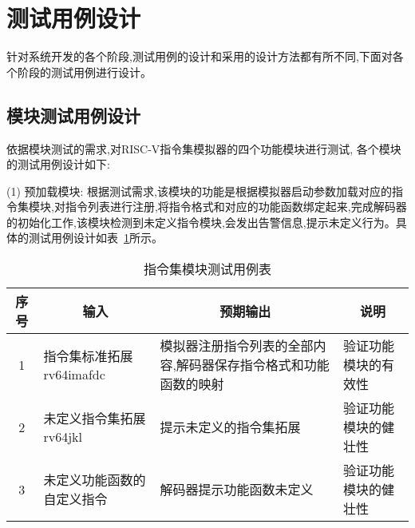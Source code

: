 \section{测试用例设计}
针对系统开发的各个阶段,测试用例的设计和采用的设计方法都有所不同,下面对各个阶段的测试用例进行设计。

\subsection{模块测试用例设计}
依据模块测试的需求,对RISC-V指令集模拟器的四个功能模块进行测试, 各个模块的测试用例设计如下:


(1) 预加载模块: 根据测试需求,该模块的功能是根据模拟器启动参数加载对应的指令集模块,对指令列表进行注册,将指令格式和对应的功能函数绑定起来,完成解码器的初始化工作,该模块检测到未定义指令模块,会发出告警信息,提示未定义行为。具体的测试用例设计如表~\ref{tab:test1}所示。
\begin{table}[h]
    \centering
    \caption{指令集模块测试用例表}
    \label{tab:test1}
    \begin{tabular}{clll}
      \toprule
      \multicolumn{1}{c}{序号} & \multicolumn{1}{c}{输入} & \multicolumn{1}{c}{预期输出} &\multicolumn{1}{c}{说明}\\
      \midrule
  1	& \multicolumn{1}{m{3.5cm}}{指令集标准拓展rv64imafdc} & \multicolumn{1}{m{3.5cm}}{模拟器注册指令列表的全部内容,解码器保存指令格式和功能函数的映射} & \multicolumn{1}{m{3.5cm}}{验证功能模块的有效性}\\
  \hline
  2	& \multicolumn{1}{m{3.5cm}}{未定义指令集拓展rv64jkl} & \multicolumn{1}{m{3.5cm}}{提示未定义的指令集拓展} & \multicolumn{1}{m{3.5cm}}{验证功能模块的健壮性}\\
  \hline
  3	& \multicolumn{1}{m{3.5cm}}{未定义功能函数的自定义指令} & \multicolumn{1}{m{3.5cm}}{解码器提示功能函数未定义} & \multicolumn{1}{m{3.5cm}}{验证功能模块的健壮性}\\
      \bottomrule
    \end{tabular}
\end{table}


